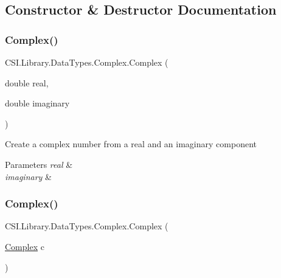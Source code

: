 \subsection{Constructor \& Destructor Documentation}
\mbox{\label{struct_c_s_i_1_1_library_1_1_data_types_1_1_complex_ac933a0bb6a12af69c7408324e93b1014}} 
\subsubsection{\texorpdfstring{Complex()}{Complex()}\hspace{0.1cm}{\footnotesize\ttfamily [1/2]}}
{\footnotesize\ttfamily C\+S\+I.\+Library.\+Data\+Types.\+Complex.\+Complex (\begin{DoxyParamCaption}\item[{double}]{real,  }\item[{double}]{imaginary }\end{DoxyParamCaption})\hspace{0.3cm}{\ttfamily [inline]}}



Create a complex number from a real and an imaginary component 


\begin{DoxyParams}{Parameters}
{\em real} & \\
\hline
{\em imaginary} & \\
\hline
\end{DoxyParams}
\mbox{\label{struct_c_s_i_1_1_library_1_1_data_types_1_1_complex_a608b9e584979c9471c92e5ec455669a0}} 
\subsubsection{\texorpdfstring{Complex()}{Complex()}\hspace{0.1cm}{\footnotesize\ttfamily [2/2]}}
{\footnotesize\ttfamily C\+S\+I.\+Library.\+Data\+Types.\+Complex.\+Complex (\begin{DoxyParamCaption}\item[{\mbox{\hyperlink{struct_c_s_i_1_1_library_1_1_data_types_1_1_complex}{Complex}}}]{c }\end{DoxyParamCaption})\hspace{0.3cm}{\ttfamily [inline]}}



